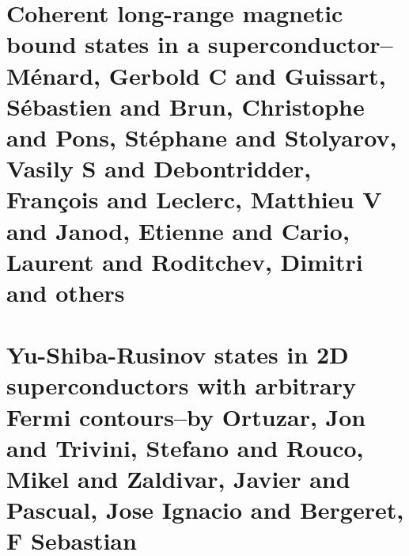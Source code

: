 \part{Coherent long-range magnetic bound states in a superconductor--M{\'e}nard, Gerbold C and Guissart, S{\'e}bastien and Brun, Christophe and Pons, St{\'e}phane and Stolyarov, Vasily S and Debontridder, Fran{\c{c}}ois and Leclerc, Matthieu V and Janod, Etienne and Cario, Laurent and Roditchev, Dimitri and others}

\clearpage

\part{Yu-Shiba-Rusinov states in 2D superconductors with arbitrary Fermi contours--by Ortuzar, Jon and Trivini, Stefano and Rouco, Mikel and Zaldivar, Javier and Pascual, Jose Ignacio and Bergeret, F Sebastian}

\clearpage

